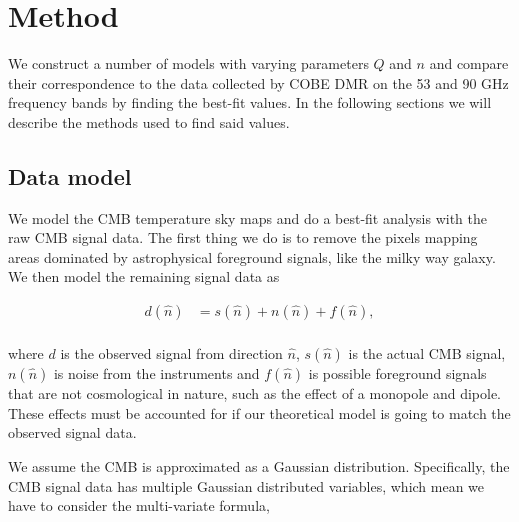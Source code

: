 \documentclass{emulateapj}
\begin{document}
\section{Method}
\label{sec:method}
 
We construct a number of models with varying parameters $Q$ and $n$ and compare their correspondence to the data collected by COBE DMR on the 53 and 90 GHz frequency bands by finding the best-fit values. In the following sections we will describe the methods used to find said values.

 
\subsection{ Data model}
We model the CMB temperature sky maps and do a best-fit analysis with the raw CMB signal data. The first thing we do is to remove the pixels mapping areas dominated by astrophysical foreground signals, like the milky way galaxy. We then model the remaining signal data as
 
\begin{equation}
 \label{dn}
 \begin{array}{rl}
 d(\hat{n})  &= s(\hat{n}) + n(\hat{n}) + f(\hat{n}), \\
 \end{array}
\end{equation}
 
 \noindent
 where $d$ is the observed signal from direction $\hat{n}$, $s(\hat{n})$ is the actual CMB signal, $n(\hat{n})$ is noise from the instruments and $f(\hat{n})$ is possible foreground signals that are not cosmological in nature, such as the effect of a monopole and dipole. These effects must be accounted for if our theoretical model is going to match the observed signal data. 
 
We assume the CMB is approximated as a Gaussian distribution. Specifically, the CMB signal data has multiple Gaussian distributed variables, which mean we have to consider the multi-variate formula, 
 
\end{document}
